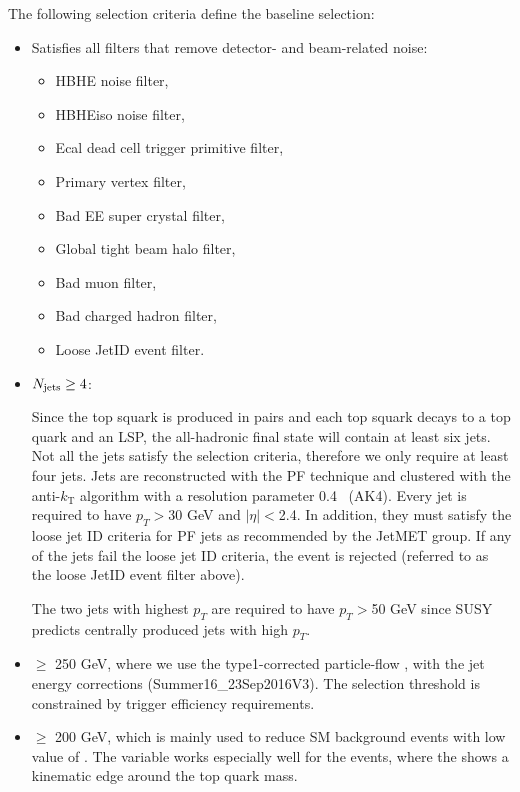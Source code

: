 The following selection criteria define the baseline selection:

\begin{itemize}
\item Satisfies all filters that remove detector- and beam-related noise: 
  \begin{itemize}
    \item HBHE noise filter, 
    \item HBHEiso noise filter, 
    \item Ecal dead cell trigger primitive filter,
    \item Primary vertex filter,
    \item Bad EE super crystal filter,
    \item Global tight beam halo filter,
    \item Bad muon filter,
    \item Bad charged hadron filter,
    \item Loose JetID event filter.
  \end{itemize}

\item $N_{\text{jets}}\geq4$:

Since the top squark is produced in pairs and each top squark decays to a top quark and an LSP, the all-hadronic final state will contain at least six jets. Not all the jets satisfy the selection criteria, therefore we only require at least four jets. Jets are reconstructed with the PF technique and clustered with the anti-$k_\mathrm{T}$ algorithm with a resolution parameter 0.4~\cite{Cacciari:2008gp} (AK4). Every jet is required to have $p_{T}>$30 GeV and $|\eta|<$2.4. In addition, they must satisfy the loose jet ID criteria for PF jets as recommended by the JetMET group. If any of the jets fail the loose jet ID criteria, the event is rejected (referred to as the loose JetID event filter above).

The two jets with highest $p_{T}$ are required to have $p_{T}>$50 GeV since SUSY predicts centrally produced jets with 
high $p_{T}$.

\item \MET $\ge$ 250 GeV, where we use the type1-corrected particle-flow \MET, with the jet energy corrections (Summer16\_23Sep2016V3). The selection threshold is constrained by trigger efficiency requirements.

\item \MTTwo $\ge$ 200 GeV, which is mainly used to reduce SM background events with low value of \MTTwo. The \MTTwo variable works especially well for the \ttbar events, where the \MTTwo shows a kinematic edge around the top quark mass.


\end{itemize}

